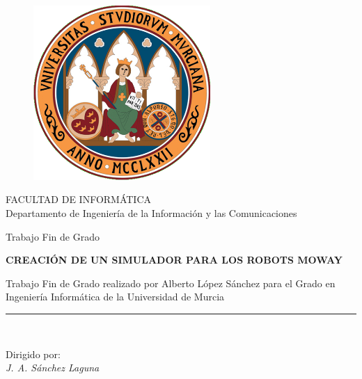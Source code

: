 

\begin{titlepage}


\begin{center}
\vspace*{-1in}
\begin{figure}[!ht]
\begin{center}
		\includegraphics[width=0.6\textwidth]{images/logo.png}
\end{center}
\end{figure}

FACULTAD DE INFORMÁTICA\\
\vspace*{0.15in}
Departamento de Ingeniería de la Información y las Comunicaciones\\
\vspace*{0.6in}
\begin{large}
Trabajo Fin de Grado\\
\end{large}
\vspace*{0.2in}
\begin{Large}
\textbf{CREACIÓN DE UN SIMULADOR PARA LOS ROBOTS MOWAY} \\
\end{Large}
\vspace*{0.3in}
\begin{large}
Trabajo Fin de Grado {\color{red}realizado} por Alberto López Sánchez para el Grado en Ingeniería Informática de la Universidad de Murcia\\
\end{large}
\vspace*{0.3in}
\rule{80mm}{0.1mm}\\
\vspace*{0.1in}
\begin{large}
Dirigido por: \\
\textit{J. A. Sánchez Laguna}\\
\end{large}
\end{center}


\end{titlepage}

